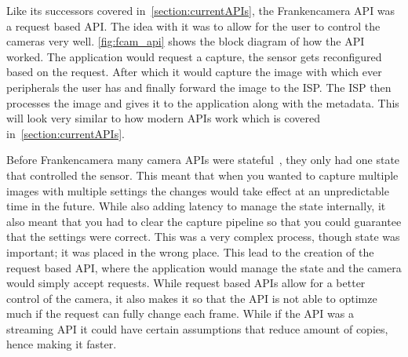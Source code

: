 Like its successors covered in~\cref{section:currentAPIs}, the Frankencamera API
was a request based API. The idea with it was to allow for the user to control
the cameras very well. \cref{fig:fcam_api} shows the block diagram of how the
API worked. The application would request a capture, the sensor gets
reconfigured based on the request. After which it would capture the image with
which ever peripherals the user has and finally forward the image to the ISP.
The ISP then processes the image and gives it to the application along with the
metadata. This will look very similar to how modern APIs work which is covered
in~\cref{section:currentAPIs}.

Before Frankencamera many camera APIs were stateful~\cite{experimentalCompPhot},
they only had one state that controlled the sensor. This meant that when you
wanted to capture multiple images with multiple settings the changes would take
effect at an unpredictable time in the future. While also adding latency to
manage the state internally, it also meant that you had to clear the capture
pipeline so that you could guarantee that the settings were correct. This was a
very complex process, though state was important; it was placed in the wrong
place. This lead to the creation of the request based API, where the
application would manage the state and the camera would simply accept requests.
While request based APIs allow for a better control of the camera, it also
makes it so that the API is not able to optimze much if the request can fully
change each frame. While if the API was a streaming API it could have certain
assumptions that reduce amount of copies, hence making it faster.
